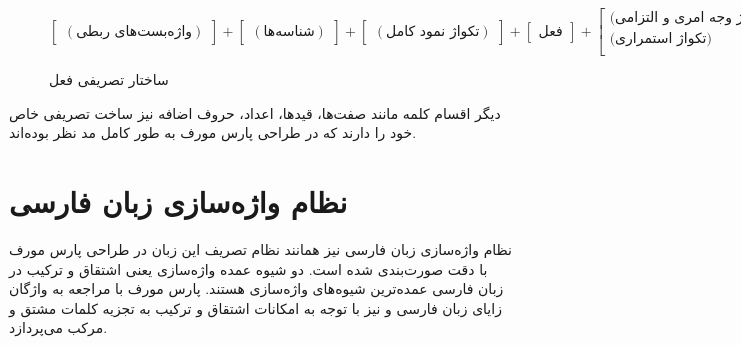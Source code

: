 \documentclass[12pt,onecolumn,a4paper]{article}
\begin{document}
    \begin{figure}[hp]
        \[
            \begin{bmatrix}
                (\textrm{واژه‌بست‌های ربطی})
            \end{bmatrix}
            +
            \begin{bmatrix}
                (\textrm{شناسه‌ها})
            \end{bmatrix}
            +
            \begin{bmatrix}
                (\textrm{تکواژ نمود کامل})
            \end{bmatrix}
            +
            \begin{bmatrix}
                \textrm{فعل}
            \end{bmatrix}
            +
            \begin{bmatrix}
                \textrm{(تکواژ وجه امری و التزامی)} \\
                \textrm{(تکواژ استمراری)} \\
            \end{bmatrix}
            +
            \begin{bmatrix}
                \textrm{تکواژ نفی}
            \end{bmatrix}
        \]
        \caption{ساختار تصریفی فعل {\mfo\citep{eslami_88}}}
    \end{figure}

    \par
    دیگر اقسام کلمه مانند صفت‌ها، قیدها، اعداد، حروف اضافه نیز ساخت تصریفی خاص خود را دارند که در طراحی پارس مورف به طور کامل مد نظر بوده‌اند.

    \section{نظام واژه‌سازی زبان فارسی}
    نظام واژه‌سازی زبان فارسی نیز همانند نظام تصریف این زبان در طراحی پارس مورف با دقت صورت‌بندی شده است. دو شیوه عمده واژه‌سازی یعنی اشتقاق  و ترکیب  در زبان فارسی عمده‌ترین شیوه‌های واژه‌سازی هستند. پارس مورف با مراجعه به واژگان زایای زبان فارسی {\mfo\citep{eslami_83}} و نیز با توجه به امکانات اشتقاق و ترکیب به تجزیه کلمات مشتق و مرکب می‌پردازد.
\end{document}
